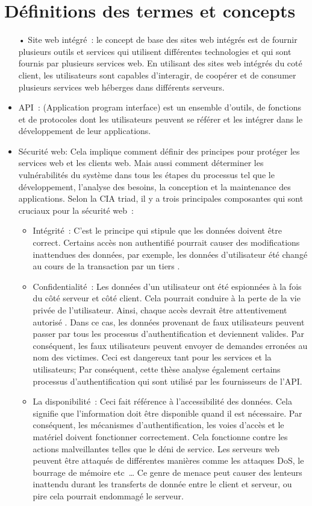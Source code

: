 \section{Définitions des termes et concepts}
\begin{itemize}
\item[•]  Site web intégré : le concept de base des sites web intégrés est de fournir plusieurs outils et services qui utilisent différentes technologies et qui sont fournis par plusieurs services web. En utilisant des sites web intégrés du coté client, les utilisateurs sont capables d'interagir, de coopérer et de consumer plusieurs services web héberges dans différents serveurs.

\item  API : (Application program interface)  est un ensemble d'outils,  de fonctions et de protocoles dont les utilisateurs peuvent se référer et les intégrer dans le développement de leur applications.

\item  Sécurité web: Cela implique comment définir des principes pour protéger les services web et les clients web. Mais aussi comment déterminer les vulnérabilités du  système dans tous les étapes du processus tel que le développement, l'analyse des besoins, la conception et la maintenance des applications. Selon la CIA triad, il y a trois principales composantes qui sont cruciaux pour la sécurité web :
 \begin{itemize}
 \item Intégrité : C'est le principe qui stipule que les données doivent être correct. Certains accès non authentifié pourrait causer des modifications inattendues des données, par exemple, les données d'utilisateur été changé au cours de la transaction par un tiers \cite{2}. 
 \item Confidentialité : Les données d'un utilisateur ont été espionnées à la fois du côté serveur et côté client. Cela pourrait conduire à la perte de la vie privée de l'utilisateur. Ainsi, chaque accès devrait être attentivement  autorisé \cite{9}. Dans ce cas, les données provenant de faux utilisateurs  peuvent passer par tous les processus d'authentification et deviennent valides. Par conséquent, les faux utilisateurs peuvent envoyer de demandes erronées au nom des victimes. Ceci est dangereux tant pour les services et la utilisateurs; Par conséquent, cette thèse analyse également certains processus d'authentification qui sont utilisé par les fournisseurs de l'API.
 \item La disponibilité : Ceci fait référence à l'accessibilité des données. Cela signifie que l'information doit être disponible quand il est nécessaire. Par conséquent, les mécanismes d'authentification, les voies d'accès et le matériel doivent fonctionner correctement. Cela fonctionne contre les actions malveillantes telles que le déni de service. Les serveurs web peuvent être attaqués de différentes manières comme les attaques DoS, le bourrage de mémoire etc … Ce genre de menace peut causer des lenteurs inattendu durant les transferts de donnée entre le client et serveur, ou pire cela pourrait endommagé le serveur.
 \end{itemize}
\end{itemize}
